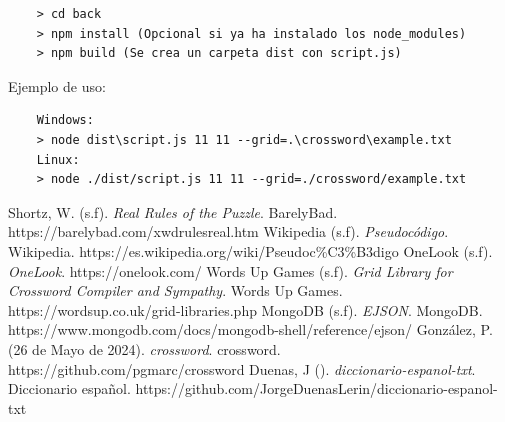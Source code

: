 \documentclass[12pt, a4paper]{article}
\begin{document}
\begin{verbatim}
	> cd back
	> npm install (Opcional si ya ha instalado los node_modules)
	> npm build (Se crea un carpeta dist con script.js)
\end{verbatim}

Ejemplo de uso:

\begin{verbatim}
	Windows:
	> node dist\script.js 11 11 --grid=.\crossword\example.txt
	Linux:
	> node ./dist/script.js 11 11 --grid=./crossword/example.txt
\end{verbatim}

\begin{thebibliography}{100}
	 Shortz, W. (s.f). \textit{Real Rules of the Puzzle}.
	BarelyBad. https://barelybad.com/xwdrulesreal.htm
	 Wikipedia (s.f). \textit{Pseudocódigo}. Wikipedia. https://es.wikipedia.org/wiki/Pseudoc\%C3\%B3digo
	 OneLook (s.f). \textit{OneLook}. https://onelook.com/
	 Words Up Games (s.f). \textit{Grid Library for Crossword 
	Compiler and Sympathy}. Words Up Games. https://wordsup.co.uk/grid-libraries.php
	 MongoDB (s.f). \textit{EJSON}. MongoDB. https://www.mongodb.com/docs/mongodb-shell/reference/ejson/
	 González, P. (26 de Mayo de 2024). \textit{crossword}. crossword.
	https://github.com/pgmarc/crossword
	 Duenas, J (). \textit{diccionario-espanol-txt}. Diccionario español.
	https://github.com/JorgeDuenasLerin/diccionario-espanol-txt
\end{thebibliography}
\end{document}
